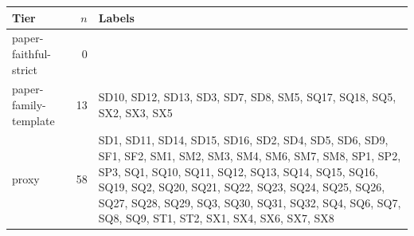 \begin{tabular}{lrl}
\toprule
Tier & $n$ & Labels \\
\midrule
paper-faithful-strict & 0 &  \\
paper-family-template & 13 & SD10, SD12, SD13, SD3, SD7, SD8, SM5, SQ17, SQ18, SQ5, SX2, SX3, SX5 \\
proxy & 58 & SD1, SD11, SD14, SD15, SD16, SD2, SD4, SD5, SD6, SD9, SF1, SF2, SM1, SM2, SM3, SM4, SM6, SM7, SM8, SP1, SP2, SP3, SQ1, SQ10, SQ11, SQ12, SQ13, SQ14, SQ15, SQ16, SQ19, SQ2, SQ20, SQ21, SQ22, SQ23, SQ24, SQ25, SQ26, SQ27, SQ28, SQ29, SQ3, SQ30, SQ31, SQ32, SQ4, SQ6, SQ7, SQ8, SQ9, ST1, ST2, SX1, SX4, SX6, SX7, SX8 \\
\bottomrule
\end{tabular}
